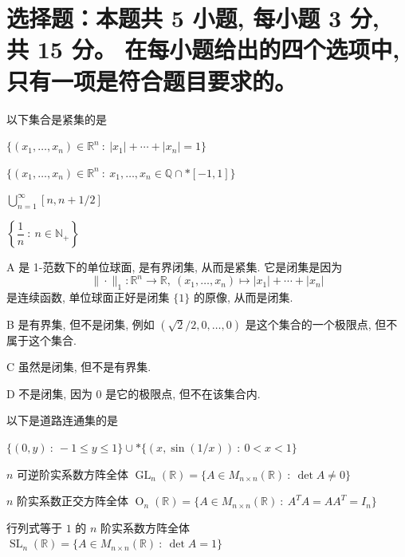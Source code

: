 \fi




\section{%
  选择题：本题共 5 小题, 每小题 3 分, 共 15 分。
  在每小题给出的四个选项中, 只有一项是符合题目要求的。
}


\begin{question}
以下集合是紧集的是 \paren[A]

\begin{choices}
\item $\{ (x_1, \dots, x_n) \in \mathbb{R}^n ~ : ~ |x_1| + \cdots + |x_n| = 1 \}$
\item $\{ (x_1, \dots, x_n) \in \mathbb{R}^n ~ : ~ x_1, \dots, x_n \in \mathbb{Q} \cap* [-1, 1] \}$
\item $\displaystyle \bigcup_{n=1}^{\infty} [n, n + 1/2]$
\item $\displaystyle \left\{ \dfrac{1}{n} ~ : ~ n \in \mathbb{N}_+ \right\}$
\end{choices}
\end{question}

\begin{solution}
A 是 1-范数下的单位球面, 是有界闭集, 从而是紧集. 它是闭集是因为
$$
\| \cdot \|_1: \mathbb{R}^n \rightarrow \mathbb{R}, ~ (x_1, \dots, x_n) \mapsto |x_1| + \cdots + |x_n|
$$
是连续函数, 单位球面正好是闭集 $\{1\}$ 的原像, 从而是闭集.

B 是有界集, 但不是闭集, 例如 $(\sqrt{2}/2, 0, \dots, 0)$ 是这个集合的一个极限点, 但不属于这个集合.

C 虽然是闭集, 但不是有界集.

D 不是闭集, 因为 $0$ 是它的极限点, 但不在该集合内.
\end{solution}


\begin{question}
以下是道路连通集的是 \paren[D]

\begin{choices}
\item $\{ (0,y) ~:~ -1\leqslant y \leqslant 1\} \cup* \{ (x, \sin(1/x)) ~:~ 0 < x < 1 \}$
\item $n$ 可逆阶实系数方阵全体 $\operatorname{GL}_n(\mathbb{R}) = \{ A \in M_{n \times n}(\mathbb{R}) ~:~ \det A \neq 0 \}$
\item $n$ 阶实系数正交方阵全体 $\operatorname{O}_n(\mathbb{R}) = \{ A \in M_{n \times n}(\mathbb{R}) ~:~ A^TA = AA^T = I_n \}$
\item 行列式等于 $1$ 的 $n$ 阶实系数方阵全体 $\operatorname{SL}_n(\mathbb{R}) = \{ A \in M_{n \times n}(\mathbb{R}) ~:~ \det A = 1 \}$
\end{choices}
\end{question}

